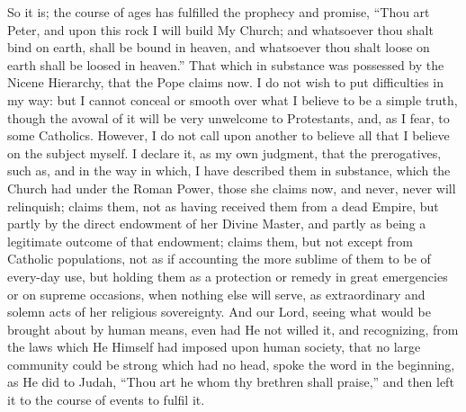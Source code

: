 So it is; the course of ages has fulfilled the prophecy and promise,
``Thou art Peter, and upon this rock I will build My Church; and
whatsoever thou shalt bind on earth, shall be bound in heaven, and
whatsoever thou shalt loose on earth shall be loosed in heaven.''
That which in substance was possessed by the Nicene Hierarchy, that the
Pope claims now. I do not wish to put difficulties in my way: but I
cannot conceal or smooth over what I believe to be a simple truth,
though the avowal of it will be very unwelcome to Protestants, and, as I
fear, to some Catholics. However, I do not call upon another to
believe all that I believe on the subject myself. I declare it, as my
own judgment, that the prerogatives, such as, and in the way in which, I
have described them in substance, which the Church had under the Roman
Power, those she claims now, and never, never will relinquish; claims
them, not as having received them from a dead Empire, but partly by the
direct endowment of her Divine Master, and partly as being a legitimate
outcome of that endowment; claims them, but not except from Catholic
populations, not as if accounting the more sublime of them to be of
every-day use, but holding them as a protection or remedy in great
emergencies or on supreme occasions, when nothing else will serve, as
extraordinary and solemn acts of her religious sovereignty. And our
Lord, seeing what would be brought about by human means, even had He not
willed it, and recognizing, from the laws which He Himself had imposed
upon human society, that no large community could be strong which had no
head, spoke the word in the beginning, as He did to Judah, ``Thou
art he whom thy brethren shall praise,'' and then left it to the
course of events to fulfil it.

